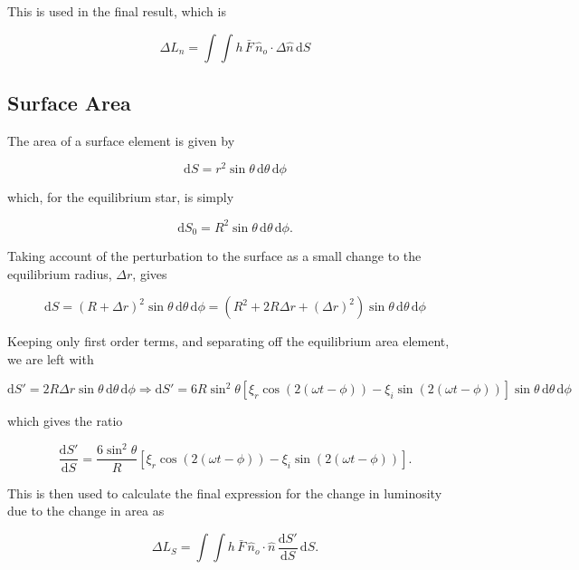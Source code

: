 \documentclass[11pt]{amsart}
\begin{document}
This is used in the final result, which is

\begin{equation}
\Delta L_{n} = \int \int h \, \bar{F} \, \hat{n}_{o} \! \cdot \! \Delta \hat{n} \, \text{d}S
\end{equation}


\subsection{Surface Area} \label{Lum:S}

The area of a surface element is given by

\begin{equation}
\text{d}S = r^{2} \sin \theta \,\text{d} \theta \, \text{d} \phi
\end{equation}

which, for the equilibrium star, is simply

\begin{equation}
\text{d}S_{0} = R^{2} \sin \theta \,\text{d} \theta \, \text{d} \phi .
\end{equation}

Taking account of the perturbation to the surface as a small change to the equilibrium radius, $\Delta r$, gives

\begin{equation}
\text{d}S = (R + \Delta r)^{2} \sin \theta \,\text{d} \theta \, \text{d} \phi = (R^{2} + 2 R \Delta r + (\Delta r)^{2} ) \sin \theta \,\text{d} \theta \, \text{d} \phi 
\end{equation}

Keeping only first order terms, and separating off the equilibrium area element, we are left with

\begin{equation}
\text{d}S' = 2 R \Delta r \sin \theta \,\text{d} \theta \, \text{d} \phi   \Longrightarrow  \text{d}S' = 6 R \sin^{2} \theta  \left[ \xi_{r} \cos (2 ( \omega t - \phi)) - \xi_{i} \sin (2 ( \omega t - \phi)) \right]  \sin \theta \,\text{d} \theta \, \text{d} \phi 
\end{equation}

which gives the ratio

\begin{equation}
\frac{\text{d}S'}{\text{d}S}  =  \frac{6 \sin^{2} \theta}{R}  \left[ \xi_{r} \cos (2 ( \omega t - \phi)) - \xi_{i} \sin (2 ( \omega t - \phi)) \right] .
\end{equation}

This is then used to calculate the final expression for the change in luminosity due to the change in area as

\begin{equation}
\Delta L_{S} = \int \int h \, \bar{F} \, \hat{n}_{o} \! \cdot \! \hat{n} \, \frac{\text{d}S'}{\text{d}S} \, \text{d}S.
\end{equation}










\end{document}
